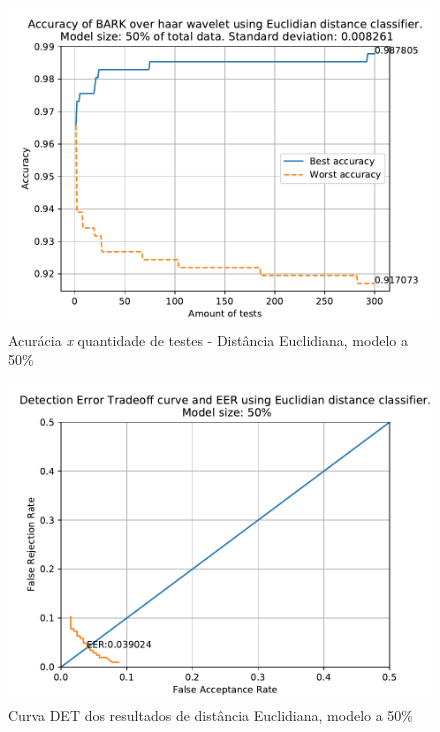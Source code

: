 			\begin{figure}[H]
				\centering
				\includegraphics[width=.9\linewidth]{images/results/confusionMatrices/classifier_Euclidian_50}
				\caption{Acurácia \textit{x} quantidade de testes - Distância Euclidiana, modelo a 50\%}
				\label{fig:classifiereuclidian50}
			\end{figure}
		
			\begin{figure}[H]
				\centering
				\includegraphics[width=.9\linewidth]{images/results/det/DET_for_classifier_Euclidian_50}
				\caption{Curva DET dos resultados de distância Euclidiana, modelo a 50\%}
				\label{fig:detforclassifiereuclidian50}
			\end{figure}
		
